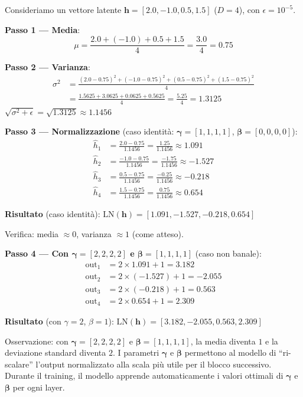 \documentclass[12pt,a4paper]{article}
\begin{document}
\begin{examplebox}
Consideriamo un vettore latente $\mathbf{h} = [2.0, -1.0, 0.5, 1.5]$ ($D = 4$), con $\epsilon = 10^{-5}$.

\textbf{Passo 1 --- Media}:
\[
\mu = \frac{2.0 + (-1.0) + 0.5 + 1.5}{4} = \frac{3.0}{4} = 0.75
\]

\textbf{Passo 2 --- Varianza}:
\begin{align*}
\sigma^2 &= \frac{(2.0 - 0.75)^2 + (-1.0 - 0.75)^2 + (0.5 - 0.75)^2 + (1.5 - 0.75)^2}{4} \\
&= \frac{1.5625 + 3.0625 + 0.0625 + 0.5625}{4} = \frac{5.25}{4} = 1.3125
\end{align*}
$\sqrt{\sigma^2 + \epsilon} = \sqrt{1.3125} \approx 1.1456$

\textbf{Passo 3 --- Normalizzazione} (caso identit\`a: $\boldsymbol{\gamma} = [1,1,1,1]$, $\boldsymbol{\beta} = [0,0,0,0]$):
\begin{align*}
\hat{h}_1 &= \frac{2.0 - 0.75}{1.1456} = \frac{1.25}{1.1456} \approx 1.091 \\
\hat{h}_2 &= \frac{-1.0 - 0.75}{1.1456} = \frac{-1.75}{1.1456} \approx -1.527 \\
\hat{h}_3 &= \frac{0.5 - 0.75}{1.1456} = \frac{-0.25}{1.1456} \approx -0.218 \\
\hat{h}_4 &= \frac{1.5 - 0.75}{1.1456} = \frac{0.75}{1.1456} \approx 0.654
\end{align*}

\textbf{Risultato} (caso identit\`a): $\text{LN}(\mathbf{h}) = [1.091, -1.527, -0.218, 0.654]$

Verifica: media $\approx 0$, varianza $\approx 1$ (come atteso).

\textbf{Passo 4 --- Con $\boldsymbol{\gamma} = [2, 2, 2, 2]$ e $\boldsymbol{\beta} = [1, 1, 1, 1]$} (caso non banale):
\begin{align*}
\text{out}_1 &= 2 \times 1.091 + 1 = 3.182 \\
\text{out}_2 &= 2 \times (-1.527) + 1 = -2.055 \\
\text{out}_3 &= 2 \times (-0.218) + 1 = 0.563 \\
\text{out}_4 &= 2 \times 0.654 + 1 = 2.309
\end{align*}

\textbf{Risultato} (con $\gamma{=}2$, $\beta{=}1$): $\text{LN}(\mathbf{h}) = [3.182, -2.055, 0.563, 2.309]$

Osservazione: con $\boldsymbol{\gamma} = [2,2,2,2]$ e $\boldsymbol{\beta} = [1,1,1,1]$, la media diventa $1$ e la deviazione standard diventa $2$. I parametri $\boldsymbol{\gamma}$ e $\boldsymbol{\beta}$ permettono al modello di ``ri-scalare'' l'output normalizzato alla scala pi\`u utile per il blocco successivo. Durante il training, il modello apprende automaticamente i valori ottimali di $\boldsymbol{\gamma}$ e $\boldsymbol{\beta}$ per ogni layer.
\end{examplebox}
\end{document}

